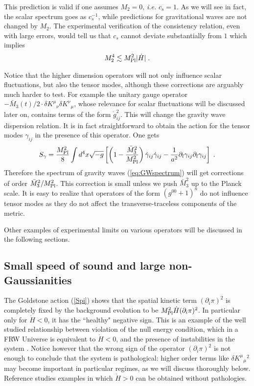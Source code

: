 \documentclass[12pt,letterpaper]{article}
\def\be{\begin{eqnarray}}
\def\ee{\end{eqnarray}}
\begin{document}
{This prediction is valid if one assumes $M_2 =0$, {\em i.e.}
$c_s=1$. As we will see in fact, the scalar spectrum goes as $c_s^{-1}$, while predictions for gravitational waves are not changed by $M_2$. The experimental verification of the consistency relation, even with large errors, would tell us that $c_s$ cannot deviate substantially from $1$ which implies
\be
M_2^4 \lesssim M_{\rm Pl}^2 |\dot H| \;.
\ee

Notice that the higher dimension operators will not only influence
scalar fluctuations, but also the tensor modes, although these
corrections are arguably much harder to test. For example the
unitary gauge operator $-\bar M_3(t)/2  \cdot \delta K^\mu {}_\nu \delta
K^\nu {}_\mu $, whose relevance for scalar fluctuations will be
discussed later on, contains terms of the form $\dot g_{ij}^2$. This
will change the gravity wave dispersion relation. It is in fact
straightforward to obtain the action for the tensor modes
$\gamma_{ij}$ in the presence of this operator. One gets
\be
S_{\gamma}=\frac{M_{\rm Pl}^2}{8} \int d^4x \sqrt{-g} \left[\left(1-\frac{\bar M_3^2}{M_{\rm Pl}^2}\right)\dot\gamma_{ij} \dot\gamma_{ij}- \frac1{a^2}
\partial_l\gamma_{ij} \partial_l\gamma_{ij} \right] \;.
\ee
Therefore the spectrum of gravity waves (\ref{eq:GWspectrum}) will get
corrections of order  $\bar M_3^2/M_{\rm Pl}^2$. This
correction is small unless we push $\bar M_3^2$ up to the Planck
scale. It is easy to realize that operators of the form
$(g^{00}+1)^{n}$ do not influence tensor modes as they do not affect
the transverse-traceless components of the metric.

Other examples of experimental limits on various operators will be discussed in the following sections.




\subsection{Small speed of sound and large non-Gaussianities}
The Goldstone action (\ref{Spi}) shows that the spatial kinetic term $(\partial_i \pi)^2$ is completely fixed by the background evolution to be $M_{\rm Pl}^2 \dot H (\partial_i\pi)^2$. In particular only for $\dot H <0$, it has the ``healthy" negative sign. This is an example of the well studied relationship between violation of the null energy condition, which in a FRW Universe is equivalent to $\dot H<0$, and the presence of instabilities in the system \cite{Hsu:2004vr,Dubovsky:2005xd}. Notice however that the wrong sign of the operator  $(\partial_i \pi)^2$ is not enough to conclude that the system is pathological: higher order terms like $\delta K^\mu {}_\mu {}^2$ may become important in particular regimes, as we will discuss thoroughly below. Reference \cite{Creminelli:2006xe} studies examples in which $\dot H >0$ can be obtained without pathologies.

}
\end{document}
